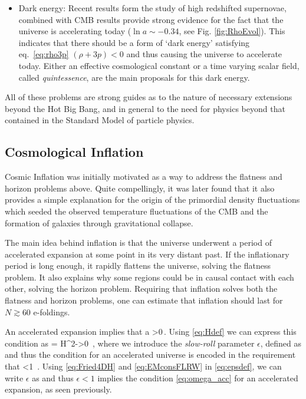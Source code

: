 \begin{itemize}
\begin{itemize}
\item Dark energy: Recent results form the study of high redshifted supernovae, combined with CMB results provide strong evidence for the fact that the universe is  accelerating today ($\ln a\sim -0.34$, see Fig. \ref{fig:RhoEvol}). This indicates that there should be a form of `dark energy' satisfying eq.~\eqref{eq:rho3p} $(\rho+3 p)<0$ and thus causing the universe to accelerate today. Either an effective cosmological constant or a time varying scalar field,
called {\em quintessence},  are the main proposals for this dark energy.
\end{itemize}
\end{itemize}

All of these problems are strong guides as to the nature of necessary extensions beyond the Hot Big Bang, and in general to the need for physics beyond that contained in the Standard Model of particle physics.

\subsection{Cosmological Inflation}
\label{sec:infla}

Cosmic Inflation was initially motivated as a way to address the flatness and horizon problems above.  Quite compellingly, it was later found that it also provides a simple explanation for the origin of the primordial density fluctuations which seeded the observed temperature fluctuations of the CMB and the formation of galaxies through gravitational collapse.

The main idea behind inflation is that the  universe underwent a period of accelerated expansion at some point in its very distant past. If the inflationary period is long enough, it rapidly flattens the universe, solving the flatness problem. It also explains why some regions could be in causal contact with each other, solving the horizon problem. Requiring that inflation solves both the flatness and horizon problems, one can estimate that inflation should last for $N\gtrsim 60$ e-foldings.

\bigskip

An accelerated expansion implies that
\be
\ddot a >0\,.
\ee
Using \eqref{eq:Hdef} we can express this condition as
\be
\label{eq:ddota}
 = H^2-\epsilon \rb >0 \,,
\ee
where we introduce the {\em slow-roll} parameter $\epsilon$, defined as
\be
\label{eq:epsdef}
\setlength\fboxsep{0.25cm}
\setlength\fboxrule{0.4pt}
\ee
and thus the condition for an accelerated universe is encoded in the requirement that
\be
\label{eq:epscond}
\epsilon<1 \,.
\ee
Using  \eqref{eq:Fried4DH} and \eqref{eq:EMconsFLRW} in \eqref{eq:epsdef}, we can write $\epsilon$ as
\be
\setlength\fboxsep{0.25cm}
\setlength\fboxrule{0.4pt}
\ee
and thus $\epsilon <1$ implies the condition  \eqref{eq:omega_acc} for an accelerated expansion, as seen previously.

